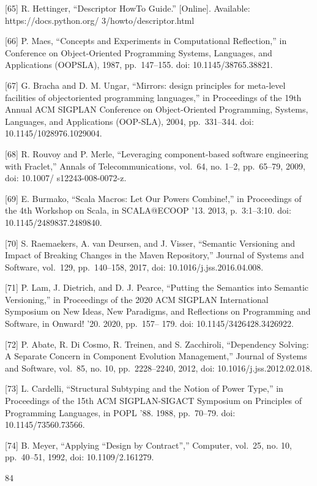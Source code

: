 \documentclass[
  10
]{article}
\begin{document}
{[}65{]} R. Hettinger, ``Descriptor HowTo Guide.'' {[}Online{]}.
Available: https://docs.python.org/ 3/howto/descriptor.html

{[}66{]} P. Maes, ``Concepts and Experiments in Computational
Reflection,'' in Conference on Object-Oriented Programming Systems,
Languages, and Applications (OOPSLA), 1987, pp.~147--155. doi:
10.1145/38765.38821.

{[}67{]} G. Bracha and D. M. Ungar, ``Mirrors: design principles for
meta-level facilities of objectoriented programming languages,'' in
Proceedings of the 19th Annual ACM SIGPLAN Conference on Object-Oriented
Programming, Systems, Languages, and Applications (OOP-SLA), 2004,
pp.~331--344. doi: 10.1145/1028976.1029004.

{[}68{]} R. Rouvoy and P. Merle, ``Leveraging component-based software
engineering with Fraclet,'' Annals of Telecommunications, vol.~64, no.
1--2, pp.~65--79, 2009, doi: 10.1007/ s12243-008-0072-z.

{[}69{]} E. Burmako, ``Scala Macros: Let Our Powers Combine!,'' in
Proceedings of the 4th Workshop on Scala, in SCALA@ECOOP '13. 2013,
p.~3:1--3:10. doi: 10.1145/2489837.2489840.

{[}70{]} S. Raemaekers, A. van Deursen, and J. Visser, ``Semantic
Versioning and Impact of Breaking Changes in the Maven Repository,''
Journal of Systems and Software, vol.~129, pp.~140--158, 2017, doi:
10.1016/j.jss.2016.04.008.

{[}71{]} P. Lam, J. Dietrich, and D. J. Pearce, ``Putting the Semantics
into Semantic Versioning,'' in Proceedings of the 2020 ACM SIGPLAN
International Symposium on New Ideas, New Paradigms, and Reflections on
Programming and Software, in Onward! '20. 2020, pp.~157-- 179. doi:
10.1145/3426428.3426922.

{[}72{]} P. Abate, R. Di Cosmo, R. Treinen, and S. Zacchiroli,
``Dependency Solving: A Separate Concern in Component Evolution
Management,'' Journal of Systems and Software, vol.~85, no. 10,
pp.~2228--2240, 2012, doi: 10.1016/j.jss.2012.02.018.

{[}73{]} L. Cardelli, ``Structural Subtyping and the Notion of Power
Type,'' in Proceedings of the 15th ACM SIGPLAN-SIGACT Symposium on
Principles of Programming Languages, in POPL '88. 1988, pp.~70--79. doi:
10.1145/73560.73566.

{[}74{]} B. Meyer, ``Applying ``Design by Contract'','' Computer,
vol.~25, no. 10, pp.~40--51, 1992, doi: 10.1109/2.161279.

84
\end{document}
